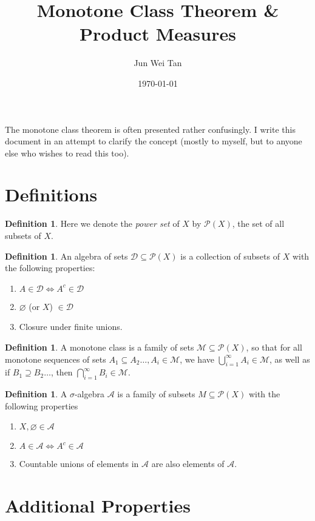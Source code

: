 \documentclass[prb,12pt]{revtex4-2}
\theoremstyle{definition}
\theoremstyle{definition}
\newtheorem{Definition}[Theorem]{Definition}
\begin{document}
\title{Monotone Class Theorem \& Product Measures}
	\author{Jun Wei Tan}
	\date{\today}
	\maketitle
	The monotone class theorem is often presented rather confusingly. I write this document in an attempt to clarify the concept (mostly to myself, but to anyone else who wishes to read this too).
	\section{Definitions}
	\begin{Definition}
		Here we denote the \emph{power set} of $X$ by $\mathcal{P}(X)$, the set of all subsets of $X$.
	\end{Definition}
	\begin{Definition}
		An algebra of sets $\mathcal{D}\subseteq  \mathcal{P}(X)$ is a collection of subsets of $X$ with the following properties:
		\begin{enumerate}
			\item $A\in \mathcal{D}\iff A^c\in \mathcal{D}$ 
			\item $\varnothing$ (or $X$) $\in \mathcal{D}$ 
			\item Closure under finite unions.
		\end{enumerate}
	\end{Definition}
\begin{Definition}
	A monotone class is a family of sets $\mathcal{M}\subseteq \mathcal{P}(X)$, so that for all monotone sequences of sets $A_1\subseteq A_2\dots, A_i\in \mathcal{M}$, we have $\bigcup_{i=1}^\infty A_i\in \mathcal{M}$, as well as if $B_1\supseteq B_2\dots$, then $\bigcap_{i=1} ^\infty B_i\in \mathcal{M}$.
\end{Definition}
\begin{Definition}
	A $\sigma$-algebra $\mathcal{A}$ is a family of subsets $M\subseteq \mathcal{P}(X)$ with the following properties
	\begin{enumerate}
		\item $X,\varnothing\in \mathcal{A}$
		\item $A\in \mathcal{A}\iff A^c\in \mathcal{A}$ 
		\item Countable unions of elements in $\mathcal{A}$ are also elements of $\mathcal{A}$.
	\end{enumerate}
	\section{Additional Properties}
\end{Definition}
\end{document}
